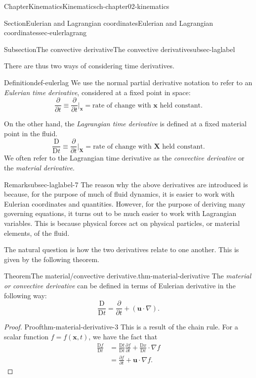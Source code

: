 \documentclass[oneside,10pt,]{book}
\numberwithin{equation}{section}
\newcommand{\DD}[2]{\frac{\mathrm{D}#1}{\mathrm{D}#2}}
\newcommand{\pd}[2]{\frac{\partial#1}{\partial#2}}
\newcommand{\bx}{\boldsymbol{x}}
\newcommand{\bX}{\boldsymbol{X}}
\newcommand{\bu}{\boldsymbol{u}}
\begin{document}
\begin{chapterptx}{Chapter}{Kinematics}{}{Kinematics}{}{}{ch-chapter02-kinematics}
\begin{sectionptx}{Section}{Eulerian and Lagrangian coordinates}{}{Eulerian and Lagrangian coordinates}{}{}{sec-eulerlagrang}
\begin{subsectionptx}{Subsection}{The convective derivative}{}{The convective derivative}{}{}{subsec-laglabel}
\par
There are thus two ways of considering time derivatives.%
\begin{definition}{Definition}{}{def-eulerlag}%
We use the normal partial derivative notation to refer to an \emph{Eulerian time derivative}, considered at a fixed point in space:%
\begin{equation*}
\pd{}{t} \equiv \pd{}{t} \biggr\rvert_{\bx} = \text{rate of change with $\bx$ held
constant}.
\end{equation*}
%
\par
On the other hand, the \emph{Lagrangian time derivative} is defined at a fixed material point in the fluid.%
\begin{equation*}
\DD{}{t} \equiv \pd{}{t} \biggr\rvert_{\bX} = \text{rate of change with $\bX$ held
constant}.
\end{equation*}
We often refer to the Lagrangian time derivative as the \emph{convective derivative} or the \emph{material derivative}.%
\end{definition}
\begin{remark}{Remark}{}{subsec-laglabel-7}%
The reason why the above derivatives are introduced is because, for the purpose of much of fluid dynamics, it is easier to work with Eulerian coordinates and quantities. However, for the purpose of deriving many governing equations, it turns out to be much easier to work with Lagrangian variables. This is because physical forces act on physical particles, or material elements, of the fluid.%
\end{remark}
The natural question is how the two derivatives relate to one another. This is given by the following theorem.%
\begin{theorem}{Theorem}{The material\slash{}convective derivative.}{}{thm-material-derivative}%
The \emph{material or convective derivative} can be defined in terms of Eulerian derivative in the following way:%
\begin{equation}
\DD{}{t} = \pd{}{t} + (\bu \cdot \nabla).\label{eqn-DDt}
\end{equation}
%
\end{theorem}
\begin{proof}{Proof}{}{thm-material-derivative-3}
This is a result of the chain rule. For a scalar function \(f = f(\bx, t)\), we have the fact that%
\begin{align*}
\DD{f}{t} &= \DD{t}{t} \pd{f}{t} + \DD{x}{t}\cdot \nabla f \\
&= \pd{f}{t} + \bu \cdot \nabla f. 
\end{align*}

\end{proof}
\end{subsectionptx}
\end{sectionptx}
\end{chapterptx}
\end{document}
